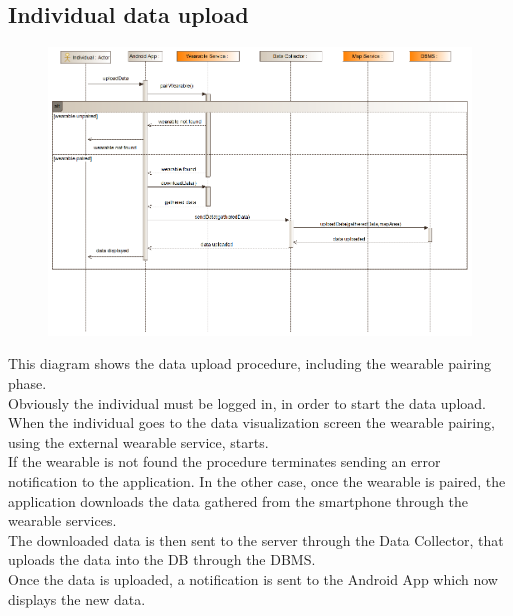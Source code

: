 \subsection{Individual data upload}
\begin{figure}[H]
\centering
\includegraphics[width=\linewidth]{resources/uml/sequence/wearablePairing.png}
\end{figure}
This diagram shows the data upload procedure, including the wearable pairing phase.\\
Obviously the individual must be logged in, in order to start the data upload.\\
When the individual goes to the data visualization screen the wearable pairing, using the external wearable service, starts.\\
If the wearable is not found the procedure terminates sending an error notification to the application.
In the other case, once the wearable is paired, the application downloads the data gathered from the smartphone through the wearable services.\\
The downloaded data is then sent to the server through the Data Collector, that uploads the data into the DB through the DBMS.\\
Once the data is uploaded, a notification is sent to the Android App which now displays the new data.

